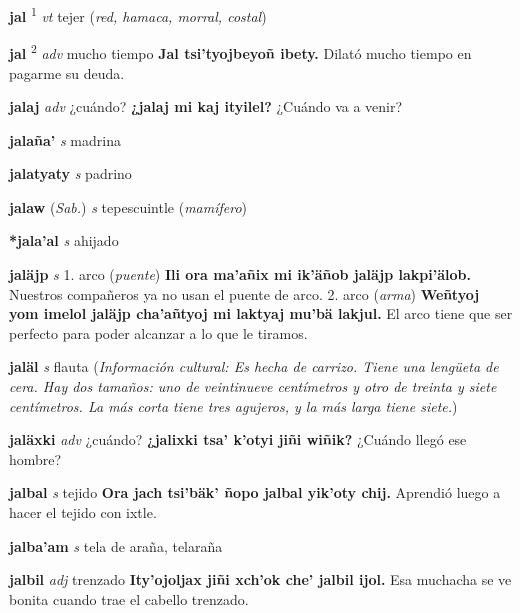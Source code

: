 \documentclass[10pt]{scrbook}
\newcommand{\entry}[1]{\textbf{#1}}
\newcommand{\onedefinition}[1]{#1.}
\newcommand{\defsuperscript}[1]{\textsuperscript{#1}}
\newcommand{\partofspeech}[1]{\textit{#1}}
\newcommand{\spanishtranslation}[1]{#1}
\newcommand{\clarification}[1]{(\textit{#1})}
\newcommand{\cholexample}[1]{\textbf{#1}}
\newcommand{\exampletranslation}[1]{#1}
\newcommand{\relevantdialect}[1]{(\textit{#1})}
\newcommand{\culturalinformation}[1]{(\textit{#1})}
\begin{document}
\begin{multicols}{2}
\entry{jal}
\defsuperscript{1}
\partofspeech{vt}
\spanishtranslation{tejer}
\clarification{red, hamaca, morral, costal}

\entry{jal}
\defsuperscript{2}
\partofspeech{adv}
\spanishtranslation{mucho tiempo}
\cholexample{Jal tsi'tyojbeyoñ ibety.}
\exampletranslation{Dilató mucho tiempo en pagarme su deuda.}

\entry{jalaj}
\partofspeech{adv}
\spanishtranslation{¿cuándo?}
\cholexample{¿jalaj mi kaj ityilel?}
\exampletranslation{¿Cuándo va a venir?}

\entry{jalaña'}
\partofspeech{s}
\spanishtranslation{madrina}

\entry{jalatyaty}
\partofspeech{s}
\spanishtranslation{padrino}

\entry{jalaw}
\relevantdialect{Sab.}
\partofspeech{s}
\spanishtranslation{tepescuintle}
\clarification{mamífero}

\entry{*jala'al}
\partofspeech{s}
\spanishtranslation{ahijado}

\entry{jaläjp}
\partofspeech{s}
\onedefinition{1}
\spanishtranslation{arco}
\clarification{puente}
\cholexample{Ili ora ma'añix mi ik'äñob jaläjp lakpi'älob.}
\exampletranslation{Nuestros compañeros ya no usan el puente de arco.}
\onedefinition{2}
\spanishtranslation{arco}
\clarification{arma}
\cholexample{Weñtyoj yom imelol jaläjp cha'añtyoj mi laktyaj mu'bä lakjul.}
\exampletranslation{El arco tiene que ser perfecto para poder alcanzar a lo que le tiramos.}

\entry{jaläl}
\partofspeech{s}
\spanishtranslation{flauta}
\culturalinformation{Información cultural: Es hecha de carrizo. Tiene una lengüeta de cera. Hay dos tamaños: uno de veintinueve centímetros y otro de treinta y siete centímetros. La más corta tiene tres agujeros, y la más larga tiene siete.}

\entry{jaläxki}
\partofspeech{adv}
\spanishtranslation{¿cuándo?}
\cholexample{¿jalixki tsa' k'otyi jiñi wiñik?}
\exampletranslation{¿Cuándo llegó ese hombre?}

\entry{jalbal}
\partofspeech{s}
\spanishtranslation{tejido}
\cholexample{Ora jach tsi'bäk' ñopo jalbal yik'oty chij.}
\exampletranslation{Aprendió luego a hacer el tejido con ixtle.}

\entry{jalba'am}
\partofspeech{s}
\spanishtranslation{tela de araña, telaraña}

\entry{jalbil}
\partofspeech{adj}
\spanishtranslation{trenzado}
\cholexample{Ity'ojoljax jiñi xch'ok che' jalbil ijol.}
\exampletranslation{Esa muchacha se ve bonita cuando trae el cabello trenzado.}


\end{multicols}
\end{document}
